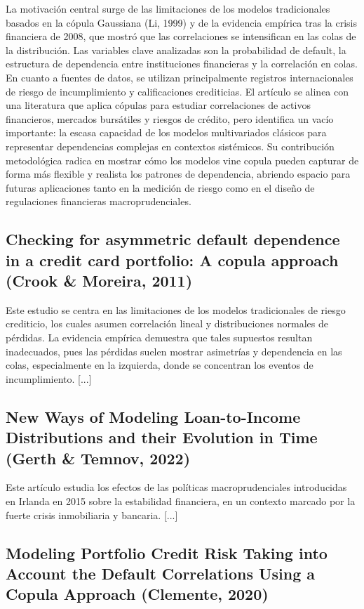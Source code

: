 \documentclass[11pt,a4paper]{article}
\begin{document}
La motivación central surge de las limitaciones de los modelos tradicionales basados en la cópula Gaussiana (Li, 1999) y de la evidencia empírica tras la crisis financiera de 2008, que mostró que las correlaciones se intensifican en las colas de la distribución. Las variables clave analizadas son la probabilidad de default, la estructura de dependencia entre instituciones financieras y la correlación en colas. En cuanto a fuentes de datos, se utilizan principalmente registros internacionales de riesgo de incumplimiento y calificaciones crediticias. El artículo se alinea con una literatura que aplica cópulas para estudiar correlaciones de activos financieros, mercados bursátiles y riesgos de crédito, pero identifica un vacío importante: la escasa capacidad de los modelos multivariados clásicos para representar dependencias complejas en contextos sistémicos. Su contribución metodológica radica en mostrar cómo los modelos vine copula pueden capturar de forma más flexible y realista los patrones de dependencia, abriendo espacio para futuras aplicaciones tanto en la medición de riesgo como en el diseño de regulaciones financieras macroprudenciales.

\subsection{Checking for asymmetric default dependence in a credit card portfolio: A copula approach (Crook \& Moreira, 2011)}

Este estudio se centra en las limitaciones de los modelos tradicionales de riesgo crediticio, los cuales asumen correlación lineal y distribuciones normales de pérdidas. La evidencia empírica demuestra que tales supuestos resultan inadecuados, pues las pérdidas suelen mostrar asimetrías y dependencia en las colas, especialmente en la izquierda, donde se concentran los eventos de incumplimiento. [...]

\subsection{New Ways of Modeling Loan-to-Income Distributions and their Evolution in Time (Gerth \& Temnov, 2022)}

Este artículo estudia los efectos de las políticas macroprudenciales introducidas en Irlanda en 2015 sobre la estabilidad financiera, en un contexto marcado por la fuerte crisis inmobiliaria y bancaria. [...]

\subsection{Modeling Portfolio Credit Risk Taking into Account the Default Correlations Using a Copula Approach (Clemente, 2020)}
\end{document}
